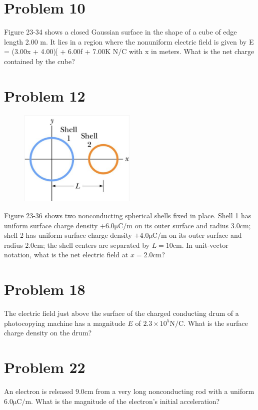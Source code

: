 \documentclass[12pt]{article}
\begin{document}
\pagebreak
\section{Problem 10}
Figure 23-34 shows a closed Gaussian surface in the shape of a cube of edge length 2.00 m. It lies in a
region where the nonuniform electric field is given by E = (3.00x + 4.00)[ + 6.00f + 7.00K N/C with x in
meters. What is the net charge contained by the cube?

\section{Problem 12}
\begin{figure}
    \vspace{-30pt}
    \includegraphics[width=0.5\textwidth]{picture_6.png} 
\end{figure}
Figure 23-36 shows two nonconducting spherical shells fixed in place. Shell 1 has uniform surface
charge density $+6.0 \unit{\micro\coulomb/\meter}$ on its outer surface and radius $3.0 \unit{\centi\meter}$; shell 2 has uniform surface charge density $+4.0 \unit{\micro\coulomb/\meter}$ on its outer surface and radius $2.0 \unit{\centi\meter}$; the shell centers are separated by $L = 10 \unit{\centi\meter}$. In unit-vector notation, what is the net electric field at $x = 2.0 \unit{\centi\meter}$?

\section{Problem 18}
The electric field just above the surface of the charged conducting drum of a photocopying machine has a magnitude $E$ of $2.3 \times 10^5 \unit{\newton/\coulomb}$. What is the surface charge density on the drum?

\section{Problem 22}
An electron is released $9.0 \unit{\centi\meter}$ from a very long nonconducting rod with a uniform $6.0 \unit{\micro\coulomb/\meter}$. What is the magnitude of the electron's initial acceleration?
\end{document}
